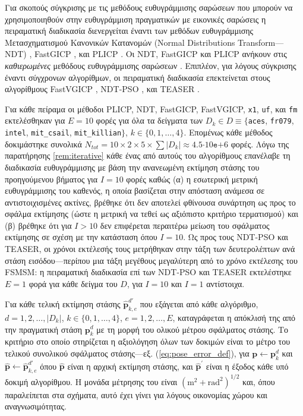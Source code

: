 Για σκοπούς σύγκρισης με τις μεθόδους ευθυγράμμισης σαρώσεων που μπορούν να
χρησιμοποιηθούν στην ευθυγράμμιση πραγματικών με εικονικές σαρώσεις η
πειραματική διαδικασία διενεργείται έναντι των μεθόδων ευθυγράμμισης
Μετασχηματισμού Κανονικών Κατανομών (Normal Distributions Transform---NDT)
\cite{Bibera,ndt_code}, FastGICP \cite{Segal2009a,fgicp_code}, και PLICP
\cite{Censi2008a,plicp_code}. Οι NDT, FastGICP και PLICP ανήκουν στις
\textit{καθιερωμένες} μεθόδους ευθυγράμμισης σαρώσεων
\cite{Koide2021a,Xu2018b,Sobreira2019b,Pishehvari2019b,Qingshan2019c,Pham2021b}.
Επιπλέον, για λόγους σύγκρισης έναντι σύγχρονων αλγορίθμων, οι πειραματική
διαδικασία επεκτείνεται στους αλγορίθμους FastVGICP
\cite{Koide2021a,fgicp_code}, NDT-PSO \cite{Bouraine2021,ndt_pso_code}, και
TEASER \cite{Yang2021,teaser_code}.

Για κάθε πείραμα οι μέθοδοι PLICP, NDT, FastGICP, FastVGICP, \texttt{x1},
\texttt{uf}, και \texttt{fm} εκτελέσθηκαν για $E = 10$ φορές για όλα τα
δείγματα των $D_k \in D \equiv \{$\texttt{aces}, \texttt{fr079},
\texttt{intel}, \texttt{mit\_csail}, \texttt{mit\_killian}$\}$, $k \in
\{0,1,\dots,4\}$.  Επομένως κάθε μέθοδος δοκιμάστηκε συνολικά $N_{tot} = 10
\times 2 \times 5 \times \sum |D_k|\approx 4.5$$\cdot10$$\texttt{e}$$+$$6$
φορές. Λόγω της παρατήρησης \ref{rem:iterative} κάθε ένας από αυτούς του
αλγορίθμους επανέλαβε τη διαδικασία ευθυγράμμισης με βάση την ανανεωμένη
εκτίμηση στάσης του προηγούμενου βήματος για $I = 10$ φορές καθώς (α) η
εσωτερική μετρική ευθυγράμμισης του καθενός, η οποία βασίζεται στην απόσταση
ανάμεσα σε αντιστοιχισμένες ακτίνες, βρέθηκε ότι δεν αποτελεί φθίνουσα
συνάρτηση ως προς το σφάλμα εκτίμησης (ώστε η μετρική να τεθεί ως αξιόπιστο
κριτήριο τερματισμού) και (β) βρέθηκε ότι για $I > 10$ δεν επιφέρεται περαιτέρω
μείωση του σφάλματος εκτίμησης σε σχέση με την κατάσταση όπου $I=10$.  Ως προς
τους NDT-PSO και TEASER, οι χρόνοι εκτέλεσής τους μετρήθηκαν στην τάξη των
δευτερολέπτων ανά στάση εισόδου---περίπου μια τάξη μεγέθους μεγαλύτερη από το
χρόνο εκτέλεσης του FSMSM: η πειραματική διαδικασία επί των NDT-PSO και TEASER
εκτελέστηκε $E=1$ φορά για κάθε δείγμα του $D$, για $I=10$ και $I=1$ αντίστοιχα.

Για κάθε τελική εκτίμηση στάσης $\hat{\bm{p}}_{k,e}^{d\prime}$ που εξάγεται από
κάθε αλγόριθμο, $d = 1,2,\dots,|D_k|$, $k \in \{0,1,\dots,4\}$, $e=1,2,\dots,E$,
καταγράφεται η απόκλισή της από την πραγματική στάση $\bm{p}_k^d$ με τη μορφή
του ολικού μέτρου σφάλματος στάσης. Το κριτήριο στο οποίο στηρίζεται η
αξιολόγηση όλων των δοκιμών είναι το μέτρο του τελικού συνολικού σφάλματος
στάσης---εξ. (\ref{eq:pose_error_def}), για $\bm{p} \leftarrow \bm{p}^d_k$ και
$\hat{\bm{p}} \leftarrow \hat{\bm{p}}^{d\prime}_{k,e}$ όπου $\hat{\bm{p}}$
είναι η αρχική εκτίμηση στάσης, και $\hat{\bm{p}}^\prime$ είναι η έξοδος κάθε
υπό δοκιμή αλγορίθμου. Η μονάδα μέτρησης του είναι
$(\text{m}^2+\text{rad}^2)^{1/2}$ και, όπου παραλείπεται στα σχήματα, αυτό έχει
γίνει για λόγους οικονομίας χώρου και αναγνωσιμότητας.

